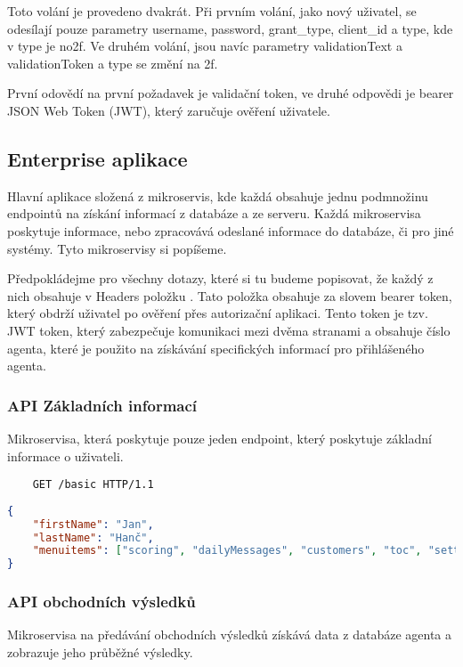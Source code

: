 \documentclass[11pt,twoside,a4paper]{book}
\begin{document}
Toto volání je provedeno dvakrát. Při prvním volání, jako nový uživatel, se odesílají pouze parametry username, password, grant\_type, client\_id a type, kde v type je no2f. Ve druhém volání, jsou navíc parametry validationText a validationToken a type se změní na 2f.

První odovědí na první požadavek je validační token, ve druhé odpovědi je bearer JSON Web Token (JWT), který zaručuje ověření uživatele.

\subsection{Enterprise aplikace}
Hlavní aplikace složená z mikroservis, kde každá obsahuje jednu podmnožinu endpointů na získání informací z databáze a ze serveru. Každá mikroservisa poskytuje informace, nebo zpracovává odeslané informace do databáze, či pro jiné systémy. Tyto mikroservisy si popíšeme.

Předpokládejme pro všechny dotazy, které si tu budeme popisovat, že každý z nich obsahuje v Headers položku . Tato položka obsahuje za slovem bearer token, který obdrží uživatel po ověření přes autorizační aplikaci. Tento token je tzv. JWT token, který zabezpečuje komunikaci mezi dvěma stranami a obsahuje číslo agenta, které je použito na získávání specifických informací pro přihlášeného agenta.

\subsubsection{API Základních informací} \label{sec:basicdataAPI}
Mikroservisa, která poskytuje pouze jeden endpoint, který poskytuje základní informace o uživateli. 

\begin{minipage}{\linewidth}
\begin{verbatim}
	GET /basic HTTP/1.1
\end{verbatim}

\begin{lstlisting}[caption={Příklad odpovědi na požadavek},language=json]
{
	"firstName": "Jan",
	"lastName": "Hanč",
	"menuitems": ["scoring", "dailyMessages", "customers", "toc", "settings", "contacts"]
}
\end{lstlisting}
\end{minipage}

\subsubsection{API obchodních výsledků} \label{sec:breAPI}
Mikroservisa na předávání obchodních výsledků získává data z databáze agenta a zobrazuje jeho průběžné výsledky.
\end{document}
